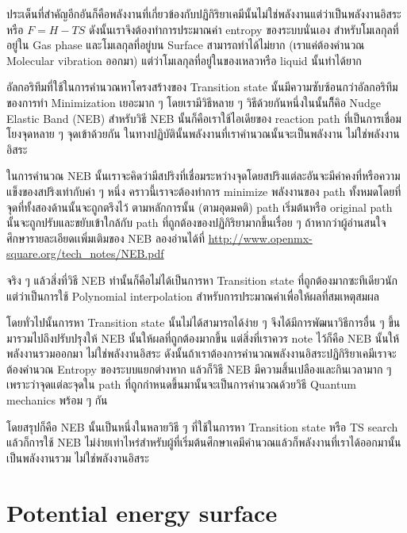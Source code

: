 ประเด็นที่สำคัญอีกอันก็คือพลังงานที่เกี่ยวข้องกับปฏิกิริยาเคมีนั้นไม่ใช่พลังงานแต่ว่าเป็นพลังงานอิสระหรือ $F = H - TS$ 
ดังนั้นเราจึงต้องทำการประมาณค่า entropy ของระบบนั่นเอง สำหรับโมเลกุลที่อยู่ใน Gas phase 
และโมเลกุลที่อยู่บน Surface สามารถทำได้ไม่ยาก (เราแค่ต้องคำนวณ Molecular vibration ออกมา) 
แต่ว่าโมเลกุลที่อยู่ในของเหลวหรือ liquid นั้นทำได้ยาก

อัลกอริทึมที่ใช้ในการคำนวณหาโครงสร้างของ Transition state นั้นมีความซับซ้อนกว่าอัลกอริทึมของการทำ 
Minimization เยอะมาก ๆ โดยเรามีวิธีหลาย ๆ วิธีด้วยกันหนึ่งในนั้นก็ึคิอ Nudge Elastic Band (NEB) 
สำหรับวิธี NEB นั้นก็คือเราใช้ไอเดียของ reaction path ที่เป็นการเชื่อมโยงจุดหลาย ๆ จุดเข้าด้วยกัน 
ในทางปฏิบัตินั้นพลังงานที่เราคำนวณนั้นจะเป็นพลังงาน ไม่ใช่พลังงานอิสระ

ในการคำนวณ NEB นั้นเราจะคิดว่ามีสปริงที่เชื่อมระหว่างจุดโดยสปริงแต่ละอันจะมีค่าคงที่หรือความแข็งของสปริงเท่ากับค่า ๆ หนึ่ง 
คราวนี้เราจะต้องทำการ minimize พลังงานของ path ทั้งหมดโดยที่จุดที่ทั้งสองด้านนั้นจะถูกตรึงไว้ ตามหลักการนั้น 
(ตามอุดมคติ) path เริ่มต้นหรือ original path นั้นจะถูกปรับและขยับเข้าใกล้กับ path ที่ถูกต้องของปฏิกิริยามากขึ้นเรื่อย ๆ 
ถ้าหากว่าผู้อ่านสนใจศึกษารายละเอียดเเพิ่มเติมของ NEB ลองอ่านได้ที่ 
\url{http://www.openmx-square.org/tech_notes/NEB.pdf}

จริง ๆ แล้วสิ่งที่วิธี NEB ทำนั้นก็คือไม่ได้เป็นการหา Transition state ที่ถูกต้องมากซะทีเดียวนักแต่ว่าเป็นการใช้ 
Polynomial interpolation สำหรับการประมาณค่าเพื่อให้ผลที่สมเหตุสมผล 

โดยทั่วไปนั้นการหา Transition state นั้นไม่ได้สามารถได้ง่าย ๆ จึงได้มีการพัฒนาวิธีการอื่น ๆ ขึ้นมารวมไปถึงปรับปรุงให้ 
NEB นั้นให้ผลที่ถูกต้องมากขึ้น แต่สิ่งที่เราควร note ไว้ก็คือ NEB นั้นให้พลังงานรวมออกมา ไม่ใช่พลังงานอิสระ 
ดังนั้นถ้าเราต้องการคำนวณพลังงานอิสระปฏิกิริยาเคมีเราจะต้องคำนวณ Entropy ของระบบแยกต่างหาก 
แล้วก็วิธี NEB มีความสิ้นเปลืองและกินเวลามาก ๆ เพราะว่าจุดแต่ละจุดใน path ที่ถูกกำหนดขึ้นมานั้นจะเป็นการคำนวณด้วยวิธี 
Quantum mechanics พร้อม ๆ กัน 

โดยสรุปก็คือ NEB นั้นเป็นหนึ่งในหลายวิธี ๆ ที่ใช้ในการหา Transition state หรือ TS search แล้วก็การใช้ NEB 
ไม่ง่ายเท่าไหร่สำหรับผู้ที่เริ่มต้นศึกษาเคมีคำนวณแล้วก็พลังงานที่เราได้ออกมานั้นเป็นพลังงานรวม ไม่ใช่พลังงานอิสระ 

\section{Potential energy surface}

